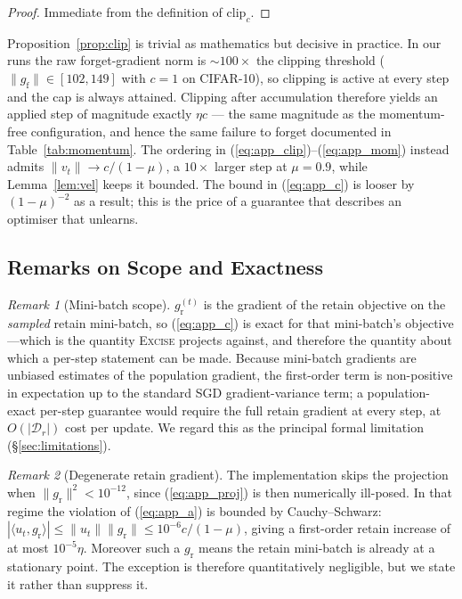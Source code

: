 \documentclass{article}
\newcommand{\ours}{\textsc{Excise}}
\newcommand{\Dr}{\mathcal{D}_r}
\newcommand{\gf}{g_{\mathrm{f}}}
\newcommand{\gr}{g_{\mathrm{r}}}
\theoremstyle{remark}
\newtheorem{remark}{Remark}
\theoremstyle{plain}
\begin{document}
\begin{proof}
Immediate from the definition of $\mathrm{clip}_c$.
\end{proof}

Proposition~\ref{prop:clip} is trivial as mathematics but decisive in practice.
In our runs the raw forget-gradient norm is ${\sim}100\times$ the clipping
threshold ($\|\gf\| \in [102,149]$ with $c=1$ on CIFAR-10), so clipping is active
at every step and the cap is always attained. Clipping after accumulation
therefore yields an applied step of magnitude exactly $\eta c$ --- the same
magnitude as the momentum-free configuration, and hence the same failure to
forget documented in Table~\ref{tab:momentum}. The ordering in
(\ref{eq:app_clip})--(\ref{eq:app_mom}) instead admits
$\|v_t\| \to c/(1-\mu)$, a $10\times$ larger step at $\mu=0.9$, while
Lemma~\ref{lem:vel} keeps it bounded. The bound in (\ref{eq:app_c}) is looser by
$(1-\mu)^{-2}$ as a result; this is the price of a guarantee that describes an
optimiser that unlearns.

\subsection{Remarks on Scope and Exactness}

\begin{remark}[Mini-batch scope]\label{rem:minibatch}
$\gr^{(t)}$ is the gradient of the retain objective on the \emph{sampled} retain
mini-batch, so (\ref{eq:app_c}) is exact for that mini-batch's objective---which
is the quantity \ours{} projects against, and therefore the quantity about which
a per-step statement can be made. Because mini-batch gradients are unbiased
estimates of the population gradient, the first-order term is non-positive in
expectation up to the standard SGD gradient-variance term; a population-exact
per-step guarantee would require the full retain gradient at every step, at
$O(|\Dr|)$ cost per update. We regard this as the principal formal limitation
(\S\ref{sec:limitations}).
\end{remark}

\begin{remark}[Degenerate retain gradient]\label{rem:degenerate}
The implementation skips the projection when $\|\gr\|^2 < 10^{-12}$, since
(\ref{eq:app_proj}) is then numerically ill-posed. In that regime the violation
of (\ref{eq:app_a}) is bounded by Cauchy--Schwarz:
$|\langle u_t,\gr\rangle| \le \|u_t\|\|\gr\| \le 10^{-6}c/(1-\mu)$, giving a
first-order retain increase of at most $10^{-5}\eta$. Moreover such a $\gr$
means the retain mini-batch is already at a stationary point. The exception is
therefore quantitatively negligible, but we state it rather than suppress it.
\end{remark}
\end{document}
